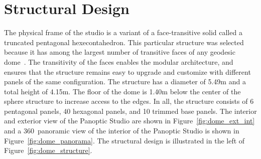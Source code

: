 \section{Structural Design}
The physical frame of the studio is a variant of a face-transitive solid called a truncated pentagonal hexecontahedron. This particular structure was selected because it has among the largest number of transitive faces of any geodesic dome~\cite{Williams1979}. The transitivity of the faces enables the modular architecture, and ensures that the structure remains easy to upgrade and customize with different panels of the same configuration. The structure has a diameter of 5.49m and a total height of 4.15m. The floor of the dome is 1.40m below the center of the sphere structure to increase access to the edges. In all, the structure consists of 6 pentagonal panels, 40 hexagonal panels, and 10 trimmed base panels. The interior and exterior view of the Panoptic Studio are shown in Figure~\ref{fig:dome_ext_int} and a 360\degree~panoramic view of the interior of the Panoptic Studio is shown in Figure~\ref{fig:dome_panorama}. The structural design is illustrated in the left of Figure~\ref{fig:dome_structure}.


